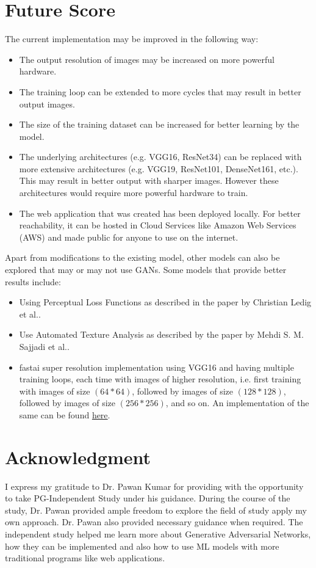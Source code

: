 \documentclass[conference]{IEEEtran}
\begin{document}
	\section{Future Score}
		The current implementation may be improved in the following way:
		\begin{itemize}
			\item The output resolution of images may be increased on more powerful hardware.
			\item The training loop can be extended to more cycles that may result in better output images.
			\item The size of the training dataset can be increased for better learning by the model.
			\item The underlying architectures (e.g. VGG16, ResNet34) can be replaced with more extensive architectures (e.g. VGG19, ResNet101, DenseNet161, etc.). This may result in better output with sharper images. However these architectures would require more powerful hardware to train.
			\item The web application that was created has been deployed locally. For better reachability, it can be hosted in Cloud Services like Amazon Web Services (AWS) and made public for anyone to use on the internet.
		\end{itemize} 
		\par Apart from modifications to the existing model, other models can also be explored that may or may not use GANs. Some models that provide better results include:
		\begin{itemize}
			\item Using Perceptual Loss Functions as described in the paper by Christian Ledig et al.\cite{b19}.
			\item Use Automated Texture Analysis as described by the paper by Mehdi S. M. Sajjadi et al.\cite{b20}.
			\item fastai super resolution implementation using VGG16 and having multiple training loops, each time with images of higher resolution, i.e. first training with images of size $(64 * 64)$, followed by images of size $(128 * 128)$, followed by images of size $(256 * 256)$, and so on. An implementation of the same can be found \href{https://nbviewer.jupyter.org/github/fastai/course-v3/blob/master/nbs/dl1/lesson7-superres.ipynb}{here}.
		\end{itemize}
		
	\section*{Acknowledgment}
		I express my gratitude to Dr. Pawan Kumar for providing with the opportunity to take PG-Independent Study under his guidance. During the course of the study, Dr. Pawan provided ample freedom to explore the field of study apply my own approach. Dr. Pawan also provided necessary guidance when required. The independent study helped me learn more about Generative Adversarial Networks, how they can be implemented and also how to use ML models with more traditional programs like web applications.
		
\end{document}
